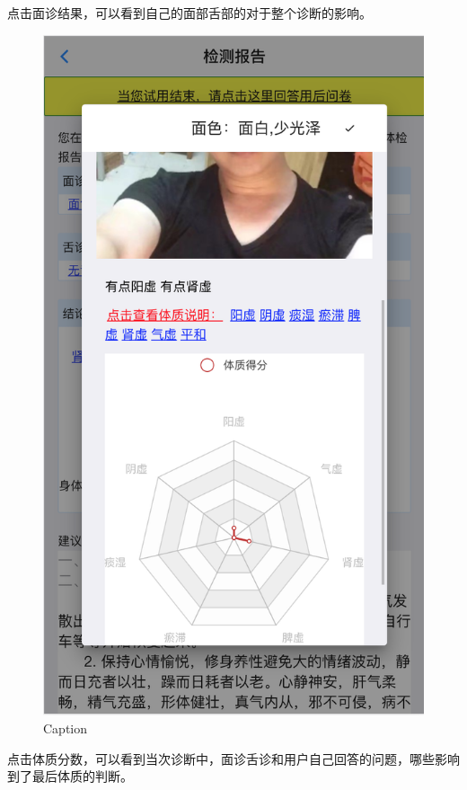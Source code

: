 点击面诊结果，可以看到自己的面部舌部的对于整个诊断的影响。
\begin{figure}
    \centering
    \includegraphics{images/report4.png}
    \caption{Caption}
    \label{fig:my_label}
\end{figure}

点击体质分数，可以看到当次诊断中，面诊舌诊和用户自己回答的问题，哪些影响到了最后体质的判断。


